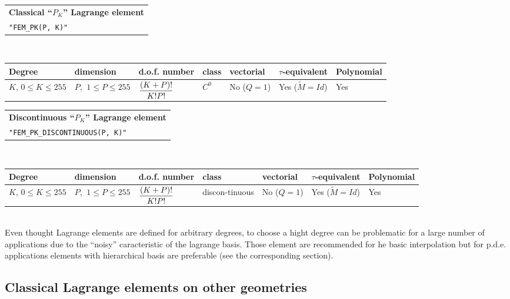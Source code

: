 \documentclass[11pt,a4paper]{article}
\begin{document}
\begin{center}
\begin{tabular}{|m{16.109cm}|} \hline
{\bf Classical ``$P_K$'' Lagrange element}\\
{\tt "FEM\_PK(P, K)"} 
\end{tabular} \\ \vspace{-1pt} 
\begin{tabular}{|m{2cm}|m{2cm}|m{2.5cm}|m{1.5cm}|m{1.5cm}|m{2cm}|m{2cm}|} \hline 
Degree & dimension & d.o.f. number & class & vectorial & \mbox{$\tau$-equivalent} & Polynomial \\ \hline
\small $K$, \mbox{$0 \leq K \leq 255$} & \small $P$, \mbox{$\ 1 \leq P \leq 255$} & ${\displaystyle \frac{\displaystyle (K+P)!}{\displaystyle K! P!}}$ & $C^0$ & No \mbox{($Q = 1$)} & Yes \mbox{($\tilde{M} = Id$)} & Yes \\ \hline
\end{tabular}
\end{center}
\begin{center}
\begin{tabular}{|m{16.109cm}|} \hline 
{\bf Discontinuous ``$P_K$'' Lagrange element}\\
{\tt "FEM\_PK\_DISCONTINUOUS(P, K)"} 
\end{tabular} \\ \vspace{-1pt} 
\begin{tabular}{|m{2cm}|m{2cm}|m{2.5cm}|m{1.5cm}|m{1.5cm}|m{2cm}|m{2cm}|} \hline 
Degree & dimension & d.o.f. number & class & vectorial & \mbox{$\tau$-equivalent} & Polynomial \\ \hline
\small $K$, \mbox{$0 \leq K \leq 255$} & \small $P$, \mbox{$\ 1 \leq P \leq 255$} & ${\displaystyle \frac{\displaystyle (K+P)!}{\displaystyle K! P!}}$ & discon-tinuous & No \mbox{($Q = 1$)} & Yes \mbox{($\tilde{M} = Id$)} & Yes \\ \hline
\end{tabular}
\end{center}$\ $\\[3cm]

Even thought Lagrange elements are defined for arbitrary degrees, to choose a hight degree can be problematic for a large number of applications due to the ``noisy'' caracteristic of the lagrange basis. Those element are recommended for he basic interpolation but for p.d.e. applications elements with hierarchical basis are preferable (see the corresponding section).

\subsection{Classical Lagrange elements on other geometries}
\end{document}
